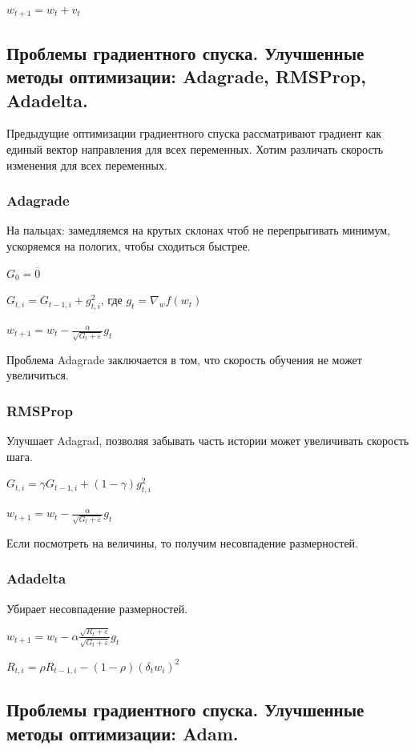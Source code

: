 \documentclass{article}
\begin{document}
$w_{t+1} = w_t + v_t$


\subsection{Проблемы градиентного спуска. Улучшенные методы оптимизации: Adagrade,
RMSProp, Adadelta.}

Предыдущие оптимизации градиентного спуска рассматривают градиент как
единый вектор направления для всех переменных. Хотим различать скорость
изменения для всех переменных.

\subsubsection{Adagrade}

На пальцах: замедляемся на крутых склонах чтоб не перепрыгивать минимум,
ускоряемся на пологих, чтобы сходиться быстрее.

$G_0 = \overline{0}$

$G_{t,i} = G_{t-1, i} + g^2_{t, i}$, где $g_t = \nabla_w f(w_t)$

$w_{t+1} = w_t - \frac{\alpha}{\sqrt{G_t + \varepsilon}} g_t$

Проблема Adagrade заключается в том, что скорость обучения не может
увеличиться.

\subsubsection{RMSProp}

Улучшает Adagrad, позволяя забывать часть истории может увеличивать
скорость шага.

$G_{t, i} = \gamma G_{t-1, i} + (1 - \gamma) g^2_{t, i}$

$w_{t+1} = w_t - \frac{\alpha}{\sqrt{G_t + \varepsilon}} g_t$

Если посмотреть на величины, то получим несовпадение размерностей.

\subsubsection{Adadelta}

Убирает несовпадение размерностей.

$w_{t+1} = w_t - \alpha \frac{\sqrt{R_t + \varepsilon}}{\sqrt{G_t + \varepsilon}} g_t$

$R_{t, i} = \rho R_{t-1, i} - (1-\rho) (\delta_t w_i)^2$


\subsection{Проблемы градиентного спуска. Улучшенные методы оптимизации: Adam.}
\end{document}
